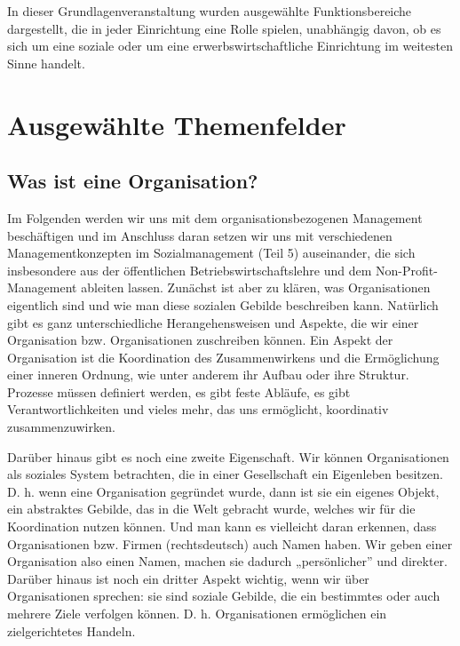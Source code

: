 \documentclass[
  letterpaper,
]{book}
\begin{document}
In dieser Grundlagenveranstaltung wurden ausgewählte Funktionsbereiche
dargestellt, die in jeder Einrichtung eine Rolle spielen, unabhängig
davon, ob es sich um eine soziale oder um eine erwerbswirtschaftliche
Einrichtung im weitesten Sinne handelt.

\part{Ausgewählte Themenfelder}

\chapter{Was ist eine Organisation?}\label{was-ist-eine-organisation}

Im Folgenden werden wir uns mit dem organisationsbezogenen Management
beschäftigen und im Anschluss daran setzen wir uns mit verschiedenen
Managementkonzepten im Sozialmanagement (Teil 5) auseinander, die sich
insbesondere aus der öffentlichen Betriebswirtschaftslehre und dem
Non-Profit-Management ableiten lassen. Zunächst ist aber zu klären, was
Organisationen eigentlich sind und wie man diese sozialen Gebilde
beschreiben kann. Natürlich gibt es ganz unterschiedliche
Herangehensweisen und Aspekte, die wir einer Organisation bzw.
Organisationen zuschreiben können. Ein Aspekt der Organisation ist die
Koordination des Zusammenwirkens und die Ermöglichung einer inneren
Ordnung, wie unter anderem ihr Aufbau oder ihre Struktur. Prozesse
müssen definiert werden, es gibt feste Abläufe, es gibt
Verantwortlichkeiten und vieles mehr, das uns ermöglicht, koordinativ
zusammenzuwirken.

Darüber hinaus gibt es noch eine zweite Eigenschaft. Wir können
Organisationen als soziales System betrachten, die in einer Gesellschaft
ein Eigenleben besitzen. D. h. wenn eine Organisation gegründet wurde,
dann ist sie ein eigenes Objekt, ein abstraktes Gebilde, das in die Welt
gebracht wurde, welches wir für die Koordination nutzen können. Und man
kann es vielleicht daran erkennen, dass Organisationen bzw. Firmen
(rechtsdeutsch) auch Namen haben. Wir geben einer Organisation also
einen Namen, machen sie dadurch „persönlicher'' und direkter. Darüber
hinaus ist noch ein dritter Aspekt wichtig, wenn wir über Organisationen
sprechen: sie sind soziale Gebilde, die ein bestimmtes oder auch mehrere
Ziele verfolgen können. D. h. Organisationen ermöglichen ein
zielgerichtetes Handeln.
\end{document}
